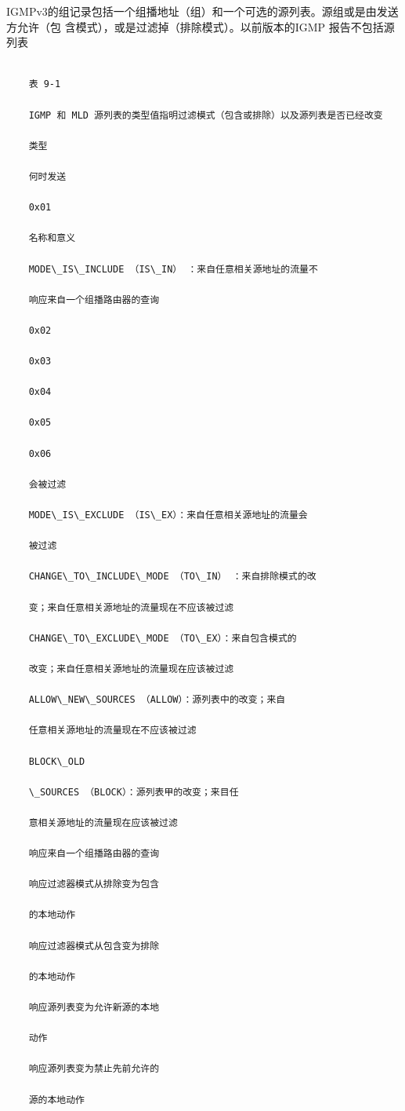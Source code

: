 IGMPv3的组记录包括一个组播地址（组）和一个可选的源列表。源组或是由发送方允许（包
含模式），或是过滤掉（排除模式）。以前版本的IGMP 报告不包括源列表
\begin{verbatim}

    表 9-1

    IGMP 和 MLD 源列表的类型值指明过滤模式（包含或排除）以及源列表是否已经改变

    类型

    何时发送

    0x01

    名称和意义

    MODE\_IS\_INCLUDE （IS\_IN） ：来自任意相关源地址的流量不

    响应来自一个组播路由器的查询

    0x02

    0x03

    0x04

    0x05

    0x06

    会被过滤

    MODE\_IS\_EXCLUDE （IS\_EX）：来自任意相关源地址的流量会

    被过滤

    CHANGE\_TO\_INCLUDE\_MODE （TO\_IN） ：来自排除模式的改

    变；来自任意相关源地址的流量现在不应该被过滤

    CHANGE\_TO\_EXCLUDE\_MODE （TO\_EX）：来自包含模式的

    改变；来自任意相关源地址的流量现在应该被过滤

    ALLOW\_NEW\_SOURCES （ALLOW）：源列表中的改变；来自

    任意相关源地址的流量现在不应该被过滤

    BLOCK\_OLD

    \_SOURCES （BLOCK）：源列表甲的改变；来目任

    意相关源地址的流量现在应该被过滤

    响应来自一个组播路由器的查询

    响应过滤器模式从排除变为包含

    的本地动作

    响应过滤器模式从包含变为排除

    的本地动作

    响应源列表变为允许新源的本地

    动作

    响应源列表变为禁止先前允许的

    源的本地动作
\end{verbatim}

